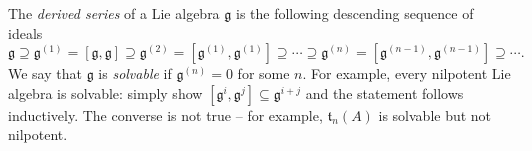 The \emph{derived series} of a Lie algebra $\mathfrak{g} $ is the following descending sequence of ideals
\[
	\mathfrak{g} \supseteq \mathfrak{g}^{(1)}  =[\mathfrak{g} ,\mathfrak{g} ]\supseteq \mathfrak{g} ^{(2)} =[\mathfrak{g} ^{(1)} ,\mathfrak{g} ^{(1)} ] \supseteq \cdots \supseteq \mathfrak{g} ^{(n)} =[\mathfrak{g} ^{(n-1)} ,\mathfrak{g} ^{(n-1)} ]\supseteq\cdots 
.\]
We say that $\mathfrak{g} $ is \emph{solvable} if $\mathfrak{g} ^{(n)} =0$ for some $n$. For example, every nilpotent Lie algebra is solvable: simply show $[\mathfrak{g} ^i,\mathfrak{g} ^j]\subseteq \mathfrak{g} ^{i+j} $ and the statement follows inductively. The converse is not true -- for example, $\mathfrak{t} _n(A)$ is solvable but not nilpotent.
